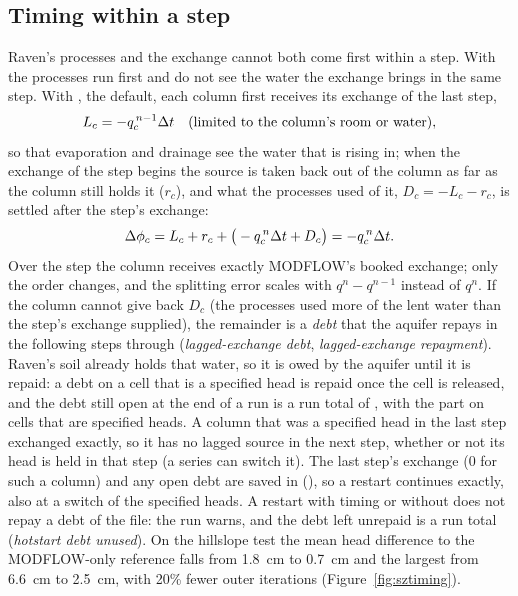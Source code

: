 \subsection{Timing within a step}\label{sec:sztiming}
Raven's processes and the exchange cannot both come first within a step. With 
the processes run first and do not see the water the exchange brings in the same step. With , the
default, each column first receives its exchange of the last step,
\begin{equation}
L_c=-q_c^{\,n-1}\Delta t\quad\text{(limited to the column's room or water)},
\end{equation}
so that evaporation and drainage see the water that is rising in; when the exchange of the step begins the source is
taken back out of the column as far as the column still holds it ($r_c$), and what the processes used of it,
$D_c=-L_c-r_c$, is settled after the step's exchange:
\begin{equation}
\Delta\phi_c=L_c+r_c+\big(-q_c^{\,n}\Delta t+D_c\big)=-q_c^{\,n}\Delta t .
\end{equation}
Over the step the column receives exactly MODFLOW's booked exchange; only the order changes, and the splitting error
scales with $q^n-q^{n-1}$ instead of $q^n$. If the column cannot give back $D_c$ (the processes used more of the lent
water than the step's exchange supplied), the remainder is a \emph{debt} that the aquifer repays in the following
steps through  (\emph{lagged-exchange debt}, \emph{lagged-exchange repayment}). Raven's soil already
holds that water, so it is owed by the aquifer until it is repaid: a debt on a cell that is a specified head is repaid
once the cell is released, and the debt still open at the end of a run is a run total of , with
the part on cells that are specified heads. A column that was a specified head in the last step exchanged exactly, so it has no lagged source in the
next step, whether or not its head is held in that step (a  series can switch it). The last step's
exchange (0 for such a column) and any open debt are saved in  (), so a restart
continues exactly, also at a switch of the specified heads. A restart with  timing or without
 does not repay a debt of the file: the run warns, and the debt left unrepaid is a run total
(\emph{hotstart debt unused}). On the hillslope test the mean head difference to the MODFLOW-only reference falls from
1.8~cm to 0.7~cm and the largest from 6.6~cm to 2.5~cm, with 20\% fewer outer iterations (Figure~\ref{fig:sztiming}).


